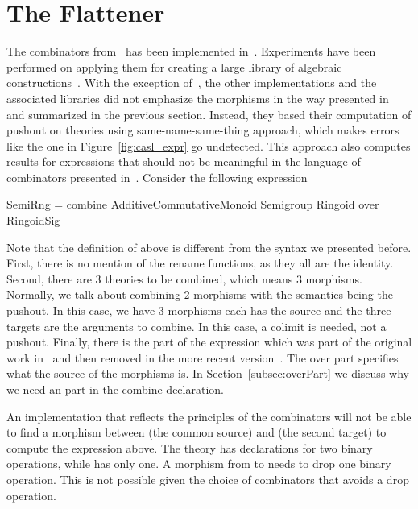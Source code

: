 \section{The Flattener}
\label{sec:lib_implementation}
The combinators from~\cite{carette2018building} has been implemented in~. 
Experiments have been performed on applying them for creating a large library of algebraic constructions~\cite{mathscheme2011experiments}. With the exception of~\cite{cicm2019diagrams}, the other implementations and the associated libraries did not emphasize the morphisms in the way presented in~\cite{carette2018building} and summarized in the previous section. Instead, they based their computation of pushout on theories using same-name-same-thing approach, which makes errors like the one in Figure~\ref{fig:casl_expr} go undetected.  
This approach also computes results for expressions that should not be meaningful in the language of combinators presented in~\cite{carette2018building}. Consider the following expression
\begin{togcode}
SemiRng = combine AdditiveCommutativeMonoid Semigroup Ringoid
          over RingoidSig
\end{togcode}
Note that the definition of  above is different from the syntax we presented before. First, there is no mention of the rename functions, as they all are the identity. Second, there are $3$ theories to be combined, which means $3$ morphisms. Normally, we talk about combining $2$ morphisms with the semantics being the pushout. In this case, we have $3$ morphisms each has the source  and the three targets are the arguments to combine. In this case, a colimit is needed, not a pushout. Finally, there is the  part of the expression which was part of the original work in~\cite{CaretteOConnorTPC} and then removed in the more recent version~\cite{carette2018building}. The over part specifies what the source of the morphisms is. In Section~\ref{subsec:overPart} we discuss why we need an  part in the combine declaration. 

An implementation that reflects the principles of the combinators will not be able to find a morphism between  (the common source) and  (the second target) to compute the expression above. 
The theory  has declarations for two binary operations, while  has only one. A morphism from  to  needs to drop one binary operation. This is not possible given the choice of combinators that avoids a drop operation. 

